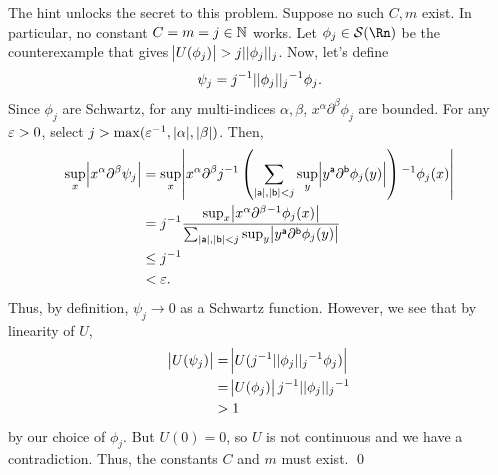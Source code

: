 \documentclass{article}
\renewcommand{\d}{\partial}
\begin{document}
\newpage
{} 
 \tri
\hop 
\solution
The hint unlocks the secret to this problem. Suppose no such $C, m$ exist. In particular, no constant $C = m = j \in \mathbb{N}$ works. Let $\phi_j \in \cal{S}(\Rn)$ be the counterexample that gives $\abs{U(\phi_j)} > j||\phi_j||_j$. Now, let's define 
\[\psi_j = j{^{-1}}||\phi_j||_j{^{-1}}\phi_j.\]
Since $\phi_j$ are Schwartz, for any multi-indices $\alpha, \beta$,  $x^\alpha \d^\beta \phi_j$ are bounded. For any $\varepsilon > 0$, select $j > \max(\varepsilon {^{-1}}, |\alpha| , |\beta|)$. Then, 
\begin{align*}
    \sup_x\abs{x^\alpha \d^\beta \psi_j} &= \sup_x \abs{x^\alpha \d^\beta j\inv \del{\sum_{|{\sf{a}}|, |{\sf{b}}| < j} \sup_{y} \abs{y^{\sf a} \d^{\sf b} \phi_j(y)}}\inv \phi_j(x)}\\
    &= j\inv \frac{ \sup_x \abs{x^\alpha \d^\beta \inv \phi_j(x)}}{\sum_{|{\sf{a}}|, |{\sf{b}}| < j} \sup_{y} \abs{y^{\sf a} \d^{\sf b} \phi_j(y)}} \\
    &\le j\inv \\
    &< \eps.
\end{align*}
Thus, by definition, $\psi_j \to 0$ as a Schwartz function. 
\hop 
However, we see that by linearity of $U$, 
\begin{align*}
    \abs{U(\psi_j)} &= \abs{U(j{^{-1}}||\phi_j||_j{^{-1}}\phi_j)}\\
    &= \abs{U(\phi_j)}j{^{-1}}||\phi_j||_j{^{-1}} \\
    &> 1
\end{align*}
by our choice of $\phi_j$. But $U(0)=0$, so $U$ is not continuous and we have a contradiction. Thus, 
the constants $C$ and $m$ must exist. \qed 
\end{document}
